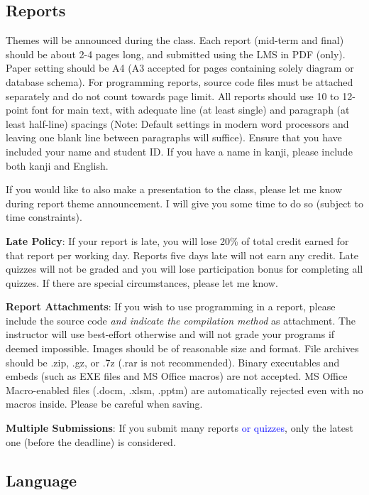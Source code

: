 \documentclass{article}
\begin{document}
\subsection{Reports}

Themes will be announced during the class. Each report (mid-term and final) should be about 2-4 pages long, and submitted using the LMS in PDF (only). Paper setting should be A4 (A3 accepted for pages containing solely diagram or database schema). For programming reports, source code files must be attached separately and do not count towards page limit. All reports should use 10 to 12-point font for main text, with adequate line (at least single) and paragraph (at least half-line) spacings (Note: Default settings in modern word processors and leaving one blank line between paragraphs will suffice). Ensure that you have included your name and student ID. If you have a name in kanji, please include both kanji and English.

If you would like to also make a presentation to the class, please let me know during report theme announcement. I will give you some time to do so (subject to time constraints).

\smallskip\noindent
\textbf{Late Policy}: If your report is late, you will lose 20\% of total credit earned for that report per working day. Reports five days late will not earn any credit. Late quizzes will not be graded and you will lose participation bonus for completing all quizzes. If there are special circumstances, please let me know.

\smallskip\noindent
\textbf{Report Attachments}: If you wish to use programming in a report, please include the source code \textit{and indicate the compilation method} as attachment. The instructor will use best-effort otherwise and will not grade your programs if deemed impossible. Images should be of reasonable size and format. File archives should be .zip, .gz, or .7z (.rar is not recommended). Binary executables and embeds (such as EXE files and MS Office macros) are not accepted. MS Office Macro-enabled files (.docm, .xlsm, .pptm) are automatically rejected even with no macros inside. Please be careful when saving.

\smallskip\noindent
\textbf{Multiple Submissions}: If you submit many reports \textcolor{blue}{or quizzes}, only the latest one (before the deadline) is considered.

\subsection{Language}
\end{document}

